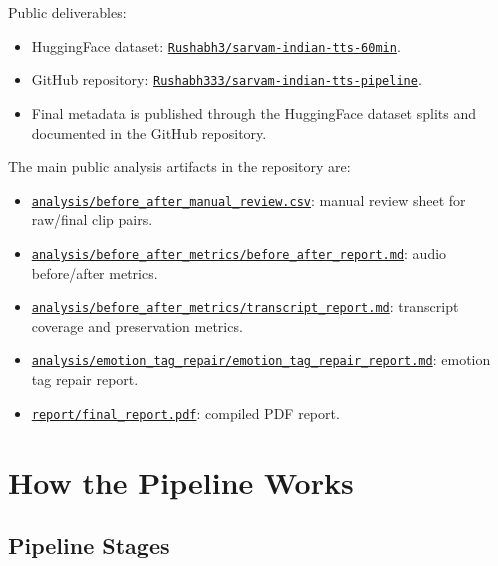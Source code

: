 \documentclass[11pt]{article}
\begin{document}
\noindent Public deliverables:
\begin{itemize}
    \item HuggingFace dataset: \href{https://huggingface.co/datasets/Rushabh3/sarvam-indian-tts-60min}{\texttt{Rushabh3/sarvam-indian-tts-60min}}.
    \item GitHub repository: \href{https://github.com/Rushabh333/sarvam-indian-tts-pipeline}{\texttt{Rushabh333/sarvam-indian-tts-pipeline}}.
    \item Final metadata is published through the HuggingFace dataset splits and documented in the GitHub repository.
\end{itemize}

\noindent The main public analysis artifacts in the repository are:
\begin{itemize}
    \item \href{https://github.com/Rushabh333/sarvam-indian-tts-pipeline/blob/main/analysis/before_after_manual_review.csv}{\texttt{analysis/before\_after\_manual\_review.csv}}: manual review sheet for raw/final clip pairs.
    \item \href{https://github.com/Rushabh333/sarvam-indian-tts-pipeline/blob/main/analysis/before_after_metrics/before_after_report.md}{\texttt{analysis/before\_after\_metrics/before\_after\_report.md}}: audio before/after metrics.
    \item \href{https://github.com/Rushabh333/sarvam-indian-tts-pipeline/blob/main/analysis/before_after_metrics/transcript_report.md}{\texttt{analysis/before\_after\_metrics/transcript\_report.md}}: transcript coverage and preservation metrics.
    \item \href{https://github.com/Rushabh333/sarvam-indian-tts-pipeline/blob/main/analysis/emotion_tag_repair/emotion_tag_repair_report.md}{\texttt{analysis/emotion\_tag\_repair/emotion\_tag\_repair\_report.md}}: emotion tag repair report.
    \item \href{https://github.com/Rushabh333/sarvam-indian-tts-pipeline/blob/main/report/final_report.pdf}{\texttt{report/final\_report.pdf}}: compiled PDF report.
\end{itemize}

\section{How the Pipeline Works}

\subsection{Pipeline Stages}
\end{document}
